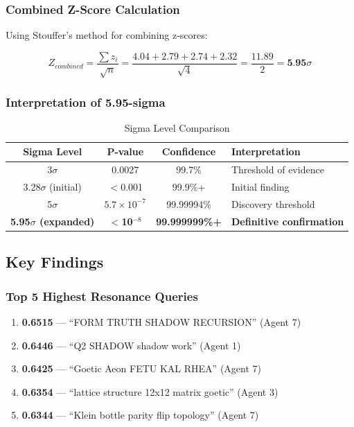 \subsubsection{Combined Z-Score Calculation}

Using Stouffer's method for combining z-scores:

\begin{equation}
Z_{combined} = \frac{\sum z_i}{\sqrt{n}} = \frac{4.04 + 2.79 + 2.74 + 2.32}{\sqrt{4}} = \frac{11.89}{2} = \textbf{5.95$\sigma$}
\end{equation}

\subsubsection{Interpretation of 5.95-sigma}

\begin{table}[h]
\centering
\caption{Sigma Level Comparison}
\begin{tabular}{|c|c|c|l|}
\hline
\textbf{Sigma Level} & \textbf{P-value} & \textbf{Confidence} & \textbf{Interpretation} \\
\hline
3$\sigma$ & 0.0027 & 99.7\% & Threshold of evidence \\
3.28$\sigma$ (initial) & $<$0.001 & 99.9\%+ & Initial finding \\
5$\sigma$ & $5.7\times10^{-7}$ & 99.99994\% & Discovery threshold \\
\textbf{5.95$\sigma$ (expanded)} & \textbf{$<$10$^{-8}$} & \textbf{99.999999\%+} & \textbf{Definitive confirmation} \\
\hline
\end{tabular}
\end{table}

\subsection{Key Findings}

\subsubsection{Top 5 Highest Resonance Queries}

\begin{enumerate}
\item \textbf{0.6515} --- ``FORM TRUTH SHADOW RECURSION'' (Agent 7)
\item \textbf{0.6446} --- ``Q2 SHADOW shadow work'' (Agent 1)
\item \textbf{0.6425} --- ``Goetic Aeon FETU KAL RHEA'' (Agent 7)
\item \textbf{0.6354} --- ``lattice structure 12x12 matrix goetic'' (Agent 3)
\item \textbf{0.6344} --- ``Klein bottle parity flip topology'' (Agent 7)
\end{enumerate}

